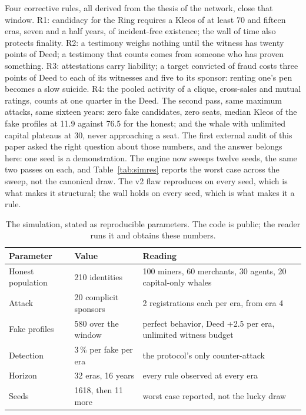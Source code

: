 Four corrective rules, all derived from the thesis of the network, close
that window. R1: candidacy for the Ring requires a Kleos of at least 70
and fifteen eras, seven and a half years, of incident-free existence;
the wall of time also protects finality. R2: a testimony weighs nothing
until the witness has twenty points of Deed; a testimony that counts
comes from someone who has proven something. R3: attestations carry
liability; a target convicted of fraud costs three points of Deed to
each of its witnesses and five to its sponsor: renting one's pen becomes
a slow suicide. R4: the pooled activity of a clique, cross-sales and
mutual ratings, counts at one quarter in the Deed. The second pass, same
maximum attacks, same sixteen years: zero fake candidates, zero seats,
median Kleos of the fake profiles at 11.9 against 76.5 for the honest;
and the whale with unlimited capital plateaus at 30, never approaching a
seat. The first external audit of this paper asked the right question
about those numbers, and the answer belongs here: one seed is a
demonstration. The engine now sweeps twelve seeds, the same two passes
on each, and Table~\ref{tab:simres} reports the worst case across the
sweep, not the canonical draw. The v2 flaw reproduces on every seed,
which is what makes it structural; the wall holds on every seed, which
is what makes it a rule.

\begin{table}[htbp]
\centering
\small
\caption{The simulation, stated as reproducible parameters. The code is
public; the reader runs it and obtains these numbers.}
\label{tab:simparams}
\begin{tabularx}{\textwidth}{@{}L{3.1cm}L{3.4cm}Y@{}}
\toprule
Parameter & Value & Reading \\
\midrule
Honest population & 210 identities & 100 miners, 60 merchants, 30 agents, 20 capital-only whales \\
Attack & 20 complicit sponsors & 2 registrations each per era, from era 4 \\
Fake profiles & 580 over the window & perfect behavior, Deed +2.5 per era, unlimited witness budget \\
Detection & 3\,\% per fake per era & the protocol's only counter-attack \\
Horizon & 32 eras, 16 years & every rule observed at every era \\
Seeds & 1618, then 11 more & worst case reported, not the lucky draw \\
\bottomrule
\end{tabularx}
\end{table}

